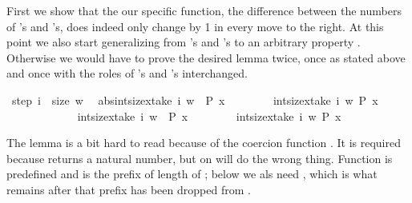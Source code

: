 \begin{isabellebody}
\begin{isamarkuptext}
First we show that the our specific function, the difference between the
numbers of 's and 's, does indeed only change by 1 in every
move to the right. At this point we also start generalizing from 's
and 's to an arbitrary property . Otherwise we would have
to prove the desired lemma twice, once as stated above and once with the
roles of 's and 's interchanged.%
\end{isamarkuptext}%
\ step{}{\isacharcolon}\ {\isachardoublequote}{\isasymforall}i\ {\isacharless}\ size\ w{\isachardot}\isanewline
\ \ abs{\isacharparenleft}{\isacharparenleft}int{\isacharparenleft}size{\isacharbrackleft}x{\isasymin}take\ {\isacharparenleft}i{\isacharplus}{}{\isacharparenright}\ w{\isachardot}\ \ P\ x{\isacharbrackright}{\isacharparenright}\ {\isacharminus}\isanewline
\ \ \ \ \ \ \ int{\isacharparenleft}size{\isacharbrackleft}x{\isasymin}take\ {\isacharparenleft}i{\isacharplus}{}{\isacharparenright}\ w{\isachardot}\ {\isasymnot}P\ x{\isacharbrackright}{\isacharparenright}{\isacharparenright}\isanewline
\ \ \ \ \ \ {\isacharminus}\isanewline
\ \ \ \ \ \ {\isacharparenleft}int{\isacharparenleft}size{\isacharbrackleft}x{\isasymin}take\ i\ w{\isachardot}\ \ P\ x{\isacharbrackright}{\isacharparenright}\ {\isacharminus}\isanewline
\ \ \ \ \ \ \ int{\isacharparenleft}size{\isacharbrackleft}x{\isasymin}take\ i\ w{\isachardot}\ {\isasymnot}P\ x{\isacharbrackright}{\isacharparenright}{\isacharparenright}{\isacharparenright}\ {\isacharless}{\isacharequal}\ {\isacharhash}{}{\isachardoublequote}%
\begin{isamarkuptxt}%
\noindent
The lemma is a bit hard to read because of the coercion function
. It is required because  returns
a natural number, but \isa{{\isacharminus}} on  will do the wrong thing.
Function  is predefined and  is the prefix of
length  of ; below we als need , which
is what remains after that prefix has been dropped from .


\end{isamarkuptxt}
\end{isabellebody}
